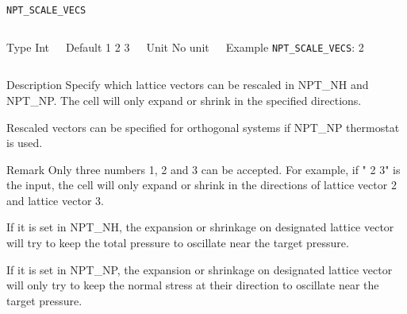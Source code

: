 \begin{frame}[allowframebreaks]{\texttt{NPT\_SCALE\_VECS}} \label{NPT_SCALE_VECS}
\vspace*{-12pt}
\begin{columns}
\begin{block}{Type}
Int
\end{block}

\begin{block}{Default}
1 2 3
\end{block}

\begin{block}{Unit}
No unit
\end{block}

\begin{block}{Example}
\texttt{NPT\_SCALE\_VECS}: 2
\end{block}
\end{columns}

\begin{block}{Description}
Specify which lattice vectors can be rescaled in NPT\_NH and NPT\_NP. The cell will only expand or shrink in the specified directions.

Rescaled vectors can be specified for orthogonal systems if NPT\_NP thermostat is used.
\end{block}

\begin{block}{Remark}
Only three numbers 1, 2 and 3 can be accepted. For example, if " 2 3" is the input, the cell will only expand or shrink in the directions of lattice vector 2 and lattice vector 3.

If it is set in NPT\_NH, the expansion or shrinkage on designated lattice vector will try to keep the total pressure to oscillate near the target pressure.

If it is set in NPT\_NP, the expansion or shrinkage on designated lattice vector will only try to keep the normal stress at their direction to oscillate near the target pressure.
\end{block}

\end{frame}



